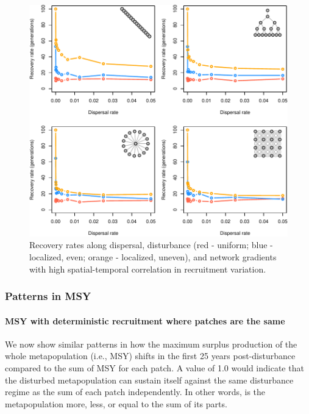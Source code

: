 \documentclass[
]{article}
\begin{document}
\begin{figure}[H]

{\centering \includegraphics{Managing_for_ecological_surprises_in_metapopulations_files/figure-latex/spatiotemporal correlation-1} 

}

\caption{Recovery rates along dispersal, disturbance (red - uniform; blue - localized, even; orange - localized, uneven), and network gradients with high spatial-temporal correlation in recruitment variation.}\label{fig:spatiotemporal correlation}
\end{figure}
\newpage

\hypertarget{patterns-in-msy}{%
\subsubsection{Patterns in MSY}\label{patterns-in-msy}}

\hypertarget{msy-with-deterministic-recruitment-where-patches-are-the-same}{%
\paragraph{MSY with deterministic recruitment where patches are the
same}\label{msy-with-deterministic-recruitment-where-patches-are-the-same}}

We now show similar patterns in how the maximum surplus production of
the whole metapopulation (i.e., MSY) shifts in the first 25 years
post-disturbance compared to the sum of MSY for each patch. A value of
1.0 would indicate that the disturbed metapopulation can sustain itself
against the same disturbance regime as the sum of each patch
independently. In other words, is the metapopulation more, less, or
equal to the sum of its parts.
\end{document}
